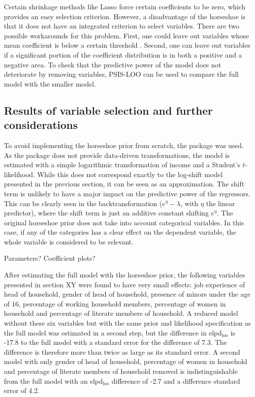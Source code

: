 Certain shrinkage methods like Lasso force certain coefficients to be zero, which provides an easy selection criterion.
However, a disadvantage of the horseshoe is that it does not have an integrated criterion to select variables. There are two possible workarounds for this problem.
First, one could leave out variables whose mean coefficient is below a certain threshold \citep{piironen_sparsity_2017}.
Second, one can leave out variables if a significant portion of the coefficient distribution is in both a positive and a negative area.
To check that the predictive power of the model does not deteriorate by removing variables, PSIS-LOO can be used to compare the full model with the smaller model.

\subsection{Results of variable selection and further considerations}
To avoid implementing the horseshoe prior from scratch, the package  was used.
As the package does not provide data-driven transformations, the model is estimated with a simple logarithmic transformation of income and a Student's $t$-likelihood.
While this does not correspond exactly to the log-shift model presented in the previous section, it can be seen as an approximation.
The shift term is unlikely to have a major impact on the predictive power of the regressors.
This can be clearly seen in the backtransformation ($e^\eta - \lambda$, with $\eta$ the linear predictor), where the shift term is just an additive constant shifting $e^\eta$.
The original horseshoe prior does not take into account categorical variables.
In this case, if any of the categories has a clear effect on the dependent variable, the whole variable is considered to be relevant.

Parameters? Coefficient plots?

After estimating the full model with the horseshoe prior, the following variables presented in section XY were found to have very small effects: job experience of head of household, gender of head of household, presence of minors under the age of 16, percentage of working household members, percentage of women in household and percentage of literate members of household.
A reduced model without these six variables but with the same prior and likelihood specification as the full model was estimated in a second step, but the difference in elpd$_{\text{loo}}$ is -17.8 to the full model with a standard error for the difference of 7.3.
The difference is therefore more than twice as large as its standard error.
A second model with only gender of head of household, percentage of women in household and percentage of literate members of household removed is indistinguishable from the full model with an elpd$_{\text{loo}}$ difference of -2.7 and a difference standard error of 4.2.

